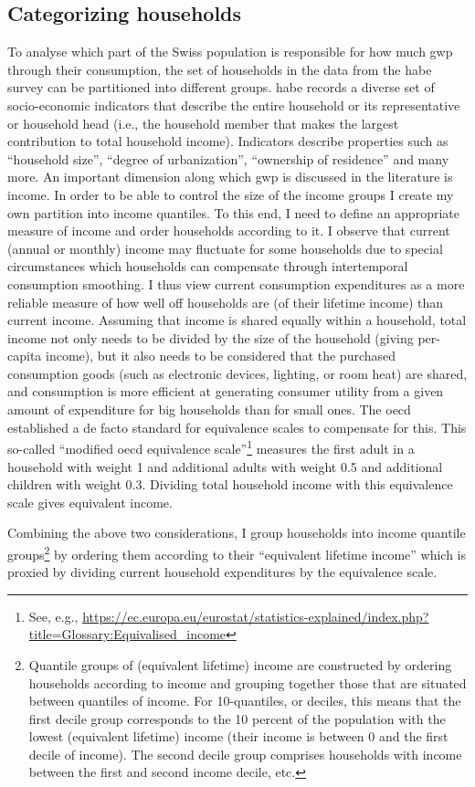 \documentclass[referee, lineno, pdflatex,sn-apa]{sn-jnl}%
\theoremstyle{thmstyleone}%
\theoremstyle{thmstyletwo}%
\theoremstyle{thmstylethree}%
\begin{document}
\subsection*{Categorizing households}
To analyse which part of the Swiss population is responsible for how much \ac{gwp} through their consumption, the set of households in the data from the \ac{habe} survey can be partitioned into different groups.
\ac{habe} records a diverse set of socio-economic indicators that describe the entire household or its representative or household head (i.e., the household member that makes the largest contribution to total household income).
Indicators describe properties such as ``household size'', ``degree of urbanization'', ``ownership of residence'' and many more.
An important dimension along which \ac{gwp} is discussed in the literature is income.
In order to be able to control the size of the income groups I create my own partition into income quantiles.
To this end, I need to define an appropriate measure of income and order households according to it.
I observe that current (annual or monthly) income may fluctuate for some households due to special circumstances which households can compensate through intertemporal consumption smoothing.
I thus view current consumption expenditures as a more reliable measure of how well off households are (of their lifetime income) than current income.
Assuming that income is shared equally within a household, total income not only needs to be divided by the size of the household (giving per-capita income), but it also needs to be considered that the purchased consumption goods (such as electronic devices, lighting, or room heat) are shared, and consumption is more efficient at generating consumer utility from a given amount of expenditure for big households than for small ones.
The \ac{oecd} established a de facto standard for equivalence scales to compensate for this.
This so-called ``modified \ac{oecd} equivalence scale''\footnote{%
  See, e.g., \url{https://ec.europa.eu/eurostat/statistics-explained/index.php?title=Glossary:Equivalised_income}
} measures the first adult in a household with weight 1 and additional adults with weight 0.5 and additional children with weight 0.3.
Dividing total household income with this equivalence scale gives equivalent income.

Combining the above two considerations, I group households into income quantile groups\footnote{%
  Quantile groups of (equivalent lifetime) income are constructed by ordering households according to income and grouping together those that are situated between quantiles of income.
  For 10-quantiles, or deciles, this means that the first decile group corresponds to the 10 percent of the population with the lowest (equivalent lifetime) income (their income is between 0 and the first decile of income).
  The second decile group comprises households with income between the first and second income decile, etc.
}
by ordering them according to their ``equivalent lifetime income'' which is proxied by dividing current household expenditures by the equivalence scale.
\end{document}
